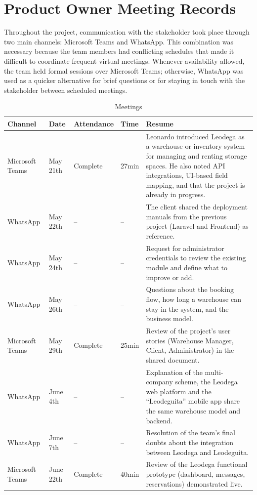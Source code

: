\documentclass[11pt,a4paper,oneside]{report}
\begin{document}
\chapter{Product Owner Meeting Records}
Throughout the project, communication with the stakeholder took place through two main channels: Microsoft Teams and WhatsApp. This combination was necessary because the team members had conflicting schedules that made it difficult to coordinate frequent virtual meetings. Whenever availability allowed, the team held formal sessions over Microsoft Teams; otherwise, WhatsApp was used as a quicker alternative for brief questions or for staying in touch with the stakeholder between scheduled meetings.
\nopagebreak
\vspace{0.2cm}
\begingroup
\footnotesize
\renewcommand{\arraystretch}{0.95}
\begin{table}[htbp]
\centering
\caption{Meetings}
\begin{tabular}{|p{2.2cm}|p{1.2cm}|p{2.0cm}|p{0.9cm}|p{6.2cm}|}
\hline
\textbf{Channel} & \textbf{Date} & \textbf{Attendance} & \textbf{Time} & \textbf{Resume} \\
\hline
Microsoft Teams & May 21th & Complete & 27min & Leonardo introduced Leodega as a warehouse or inventory system for managing and renting storage spaces. He also noted API integrations, UI-based field mapping, and that the project is already in progress. \\
\hline
WhatsApp & May 22th & -- & -- & The client shared the deployment manuals from the previous project (Laravel and Frontend) as reference. \\
\hline
WhatsApp & May 24th & -- & -- & Request for administrator credentials to review the existing module and define what to improve or add. \\
\hline
WhatsApp & May 26th & -- & -- & Questions about the booking flow, how long a warehouse can stay in the system, and the business model. \\
\hline
Microsoft Teams & May 29th & Complete & 25min & Review of the project's user stories (Warehouse Manager, Client, Administrator) in the shared document. \\
\hline
WhatsApp & June 4th & -- & -- & Explanation of the multi-company scheme, the Leodega web platform and the ``Leodeguita'' mobile app share the same warehouse model and backend. \\
\hline
WhatsApp & June 7th & -- & -- & Resolution of the team's final doubts about the integration between Leodega and Leodeguita. \\
\hline
Microsoft Teams & June 22th & Complete & 40min & Review of the Leodega functional prototype (dashboard, messages, reservations) demonstrated live. \\
\hline
\end{tabular}
\end{table}
\endgroup
\appendix
\end{document}
